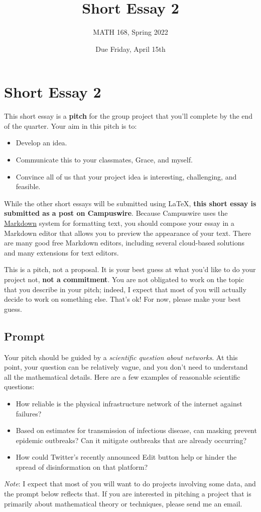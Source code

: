 \documentclass{hw}
\title{Short Essay 2}
\author{MATH 168, Spring 2022}
\date{Due Friday, April 15th}
\begin{document}
\section*{Short Essay 2}

This short essay is a \textbf{pitch} for the group project that you'll complete by the end of the quarter. 
Your aim in this pitch is to: 
\begin{itemize}
    \item Develop an idea.
    \item Communicate this to your classmates, Grace, and myself. 
    \item Convince all of us that your project idea is interesting, challenging, and feasible. 
\end{itemize}
While the other short essays will be submitted using \LaTeX, \textbf{this short essay is submitted as a post on Campuswire}. 
Because Campuswire uses the \href{https://www.markdownguide.org/cheat-sheet/}{Markdown} system for formatting text, you should compose your essay in a Markdown editor that allows you to preview the appearance of your text. 
There are many good free Markdown editors, including several cloud-based solutions and many extensions for text editors. 

This is a pitch, not a proposal. 
It is your best guess at what you'd like to do your project not, \textbf{not a commitment}. 
You are not obligated to work on the topic that you describe in your pitch; indeed, I expect that most of you will actually decide to work on something else. 
That's ok! 
For now, please make your best guess. 


\subsection*{Prompt}

Your pitch should be guided by a \emph{scientific question about networks}. 
At this point, your question can be relatively vague, and you don't need to understand all the mathematical details. 
Here are a few examples of reasonable scientific questions: 
\begin{itemize}
    \item How reliable is the physical infrastructure network of the internet against failures? 
    \item Based on estimates for transmission of infectious disease, can masking prevent epidemic outbreaks? Can it mitigate outbreaks that are already occurring? 
    \item How could Twitter's recently announced Edit button help or hinder the spread of disinformation on that platform? 
\end{itemize}
\emph{Note}: I expect that most of you will want to do projects involving some data, and the prompt below reflects that. 
If you are interested in pitching a project that is primarily about mathematical theory or techniques, please send me an email. 
\end{document}

